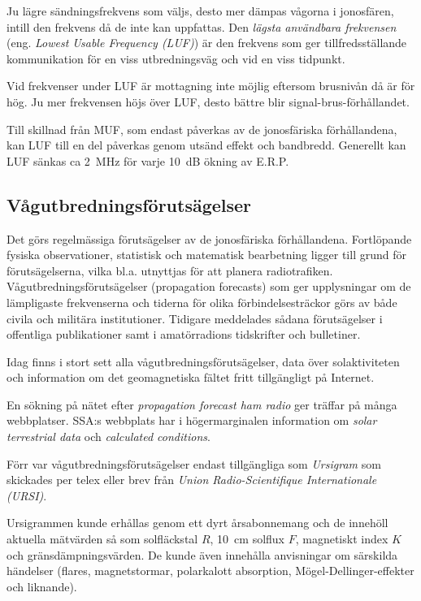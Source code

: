 Ju lägre sändningsfrekvens som väljs, desto mer dämpas vågorna i
jonosfären, intill den frekvens då de inte kan uppfattas.
Den \emph{lägsta användbara frekvensen}
(eng. \emph{Lowest Usable Frequency (LUF)}) är den
frekvens som ger tillfredsställande kommunikation för en viss
utbredningsväg och vid en viss tidpunkt.

Vid frekvenser under LUF är mottagning inte möjlig eftersom brusnivån
då är för hög.
Ju mer frekvensen höjs över LUF, desto bättre blir signal-brus-förhållandet.

Till skillnad från MUF, som endast påverkas av de jonosfäriska
förhållandena, kan LUF till en del påverkas genom utsänd effekt och bandbredd.
Generellt kan LUF sänkas ca 2~MHz för varje 10~dB ökning av E.R.P.

\subsection{Vågutbredningsförutsägelser}

Det görs regelmässiga förutsägelser av de jonosfäriska förhållandena.
Fortlöpande fysiska observationer, statistisk och matematisk bearbetning ligger
till grund för förutsägelserna, vilka bl.a. utnyttjas för att planera
radiotrafiken.
Vågutbredningsförutsägelser (propagation forecasts) som ger upplysningar om de
lämpligaste frekvenserna och tiderna för olika förbindelsesträckor görs av både
civila och militära institutioner. 
Tidigare meddelades sådana förutsägelser i offentliga publikationer samt i 
amatörradions tidskrifter och bulletiner.

Idag finns i stort sett alla vågutbredningsförutsägelser, data över
solaktiviteten och information om det geomagnetiska fältet fritt tillgängligt på
Internet.

En sökning på nätet efter \emph{propagation forecast ham radio} ger träffar på
många webbplatser.
SSA:s webbplats har i högermarginalen information om \emph{solar terrestrial data}
och \emph{calculated conditions}.

Förr var vågutbredningsförutsägelser endast tillgängliga som \emph{Ursigram} som
skickades per telex eller brev från \emph{Union Radio-Scientifique
Internationale (URSI)}.

Ursigrammen kunde erhållas genom ett dyrt årsabonnemang och de innehöll aktuella
mätvärden så som solfläckstal \(R\), 10~cm solflux \(F\), magnetiskt index \(K\)
och gränsdämpningsvärden.
De kunde även innehålla anvisningar om särskilda händelser (flares,
magnetstormar, polarkalott absorption, Mögel-Dellinger-effekter och liknande).

